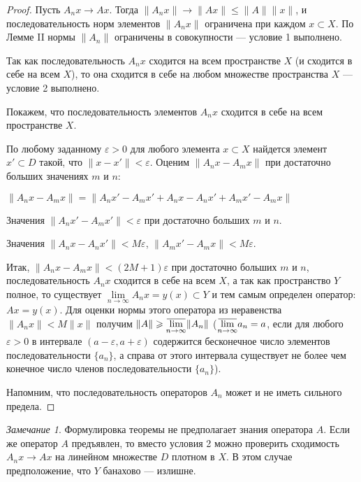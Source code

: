 \documentclass[12pt,a4paper,titlepage,oneside]{book}
\newcommand{\overbar}[1]{\mkern 1.5mu\overline{\mkern-1.5mu#1\mkern-1.5mu}\mkern 1.5mu}
\theoremstyle{definition}
\theoremstyle{plain}
\theoremstyle{break}
\theoremstyle{remark}
\newtheorem*{remark}{Замечание}
\theoremstyle{remark}
\theoremstyle{remark}
\theoremstyle{remark}
\theoremstyle{plain}
\theoremstyle{plain}
\begin{document}
\begin{proof}
 Пусть $A_n x \to A x$. Тогда $\lVert A_n x\rVert \to \lVert A x\rVert \leqslant \lVert A\rVert \lVert x\rVert$, и последовательность норм элементов $\lVert A_n x\rVert$ ограничена при каждом $x \subset X$. По Лемме II нормы $\lVert A_n\rVert$ ограничены в совокупности --- условие 1 выполнено.

Так как последовательность $A_n x$ сходится на всем пространстве $X$ (и сходится в себе на всем $X$), то она сходится в себе на любом множестве пространства $X$ --- условие 2 выполнено.

 Покажем, что последовательность элементов $A_n x$ сходится в себе на всем пространстве $X$.

По любому заданному $\varepsilon > 0$ для любого элемента $x \subset X$ найдется элемент $x' \subset D$ такой, что $\lVert x - x'\rVert < \varepsilon$. Оценим $\lVert A_n x - A_m x\rVert$ при достаточно больших значениях $m$ и $n$:

\begin{center}
$\lVert A_n x - A_m x\rVert = \lVert A_n x' - A_m x' + A_n x - A_n x' + A_m x' - A_m x\rVert$
\end{center}

Значения $\lVert A_n x' - A_m x'\rVert < \varepsilon$ при достаточно больших $m$ и $n$.

Значения $\lVert A_n x - A_n x'\rVert < M\varepsilon$, $\lVert A_m x' - A_m x\rVert < M\varepsilon$.

Итак, $\lVert A_n x - A_m x\rVert < (2M +1)\varepsilon$ при достаточно больших $m$ и $n$, последовательность $A_n x$ сходится в себе на всем $X$, а так как пространство $Y$ полное, то существует $\lim\limits_{n \to \infty} A_n x = y(x) \subset Y$ и тем самым определен оператор: $A x = y(x)$. Для оценки нормы этого оператора из неравенства $\lVert A_n x\rVert < M\lVert x\rVert$ получим $\lVert A\rVert \geqslant \overbar{\lim\limits_{n \to \infty}}\lVert A_n\rVert$ ($\overbar{\lim\limits_{n \to \infty}}a_n = a$, если для любого $\varepsilon > 0$ в интервале $(a-\varepsilon, a+\varepsilon)$ содержится бесконечное число элементов последовательности $\lbrace a_n\rbrace$, а справа от этого интервала существует не более чем конечное число членов последовательности $\lbrace a_n\rbrace$).

Напомним, что последовательность операторов $A_n$ может и не иметь сильного предела.
\end{proof}

\begin{remark}
Формулировка теоремы не предполагает знания оператора $A$. Если же оператор $A$ предъявлен, то вместо условия 2 можно проверить сходимость $A_n x\to A x$ на линейном множестве $D$ плотном в $X$. В этом случае предположение, что $Y$ банахово --- излишне.
\end{remark}
\end{document}
